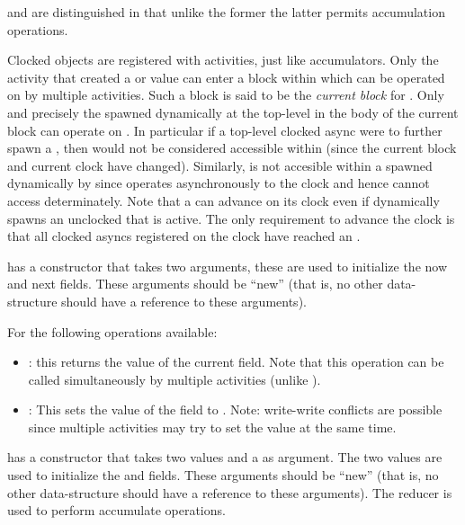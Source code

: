  and  are distinguished in that
unlike the former the latter permits accumulation operations.

Clocked objects are registered with activities, just like
accumulators.  Only the activity that created a 
 or  value  can enter a
 block within which  can be operated on
by multiple activities. Such a block is said to be the {\em current
  block} for . Only and precisely the  
spawned dynamically at the top-level in the body of the current block
can operate on . In particular if a top-level clocked async
were to further spawn a , then  would
not be considered accessible within  (since the current block
and current clock have changed).  Similarly,  is not accesible within a
 spawned dynamically by  since 
operates asynchronously to the clock and hence cannot access 
determinately. Note that a  can advance on its
clock even if  dynamically spawns an unclocked 
that is active. The only requirement to advance the clock is that all
clocked asyncs registered on the clock have reached an
.


  has a constructor that takes two  arguments, these are
used to initialize the now and next fields. These arguments should be
``new'' (that is, no other data-structure should have a reference to
these arguments).

For  the following operations available:
\begin{itemize}
\item {}: this returns the value of the current field. Note
  that this operation can be called simultaneously by multiple
  activities  (unlike ).

\item {}: This sets the value of the  field to .
Note: write-write conflicts are possible since multiple activities may
try to set the value at the same time.
\end{itemize}

 has a constructor that takes two  values and a
 as argument. The two  values are used to initialize the
 and  fields. These arguments should be ``new'' (that is, no
other data-structure should have a reference to these arguments). 
The reducer is used to perform
accumulate operations. 

